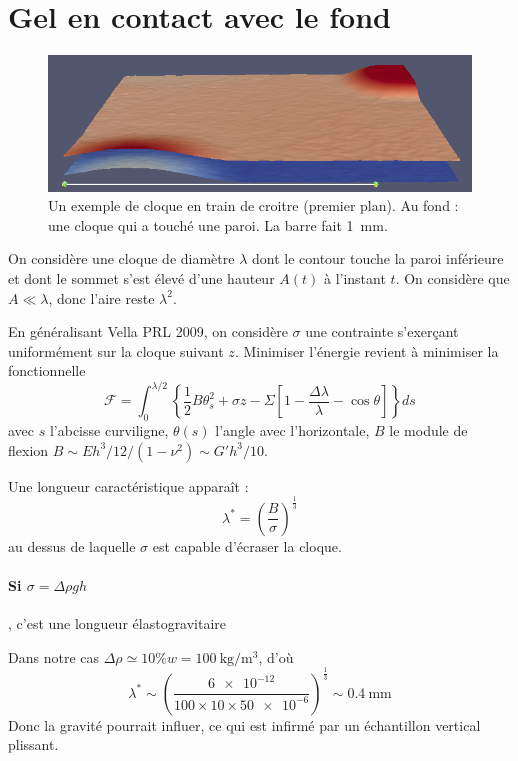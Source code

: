 \documentclass[12pt,a4paper]{article}
\author{Mathieu Leocmach}
\begin{document}
\section{Gel en contact avec le fond}

\begin{figure}
\includegraphics[width=\textwidth]{plots_0117.png}
\caption{Un exemple de cloque en train de croitre (premier plan). Au fond : une cloque qui a touché une paroi. La barre fait \SI{1}{\milli\metre}.}
\end{figure}

On considère une cloque de diamètre $\lambda$ dont le contour touche la paroi inférieure et dont le sommet s'est élevé d'une hauteur $A(t)$ à l'instant $t$. On considère que $A \ll \lambda$, donc l'aire reste $\lambda^2$.

En généralisant Vella PRL 2009, on considère $\sigma$ une contrainte s'exerçant uniformément sur la cloque suivant $z$. Minimiser l'énergie revient à minimiser la fonctionnelle
\begin{equation}
\mathcal{F} = \int_0^{\lambda/2}\left\lbrace\frac{1}{2} B \theta_s^2 + \sigma z - \Sigma \left[1-\frac{\Delta \lambda}{\lambda} - \cos\theta\right] \right\rbrace ds
\end{equation}
avec $s$ l'abcisse curviligne, $\theta(s)$ l'angle avec l'horizontale, $B$ le module de flexion $B \sim E h^3 /12 / (1-\nu^2) \sim G' h^3/10$.

Une longueur caractéristique apparaît :
\begin{equation}
\lambda^* = \left(\frac{B}{\sigma}\right)^\frac{1}{3}
\label{eq:lstar}
\end{equation}
au dessus de laquelle $\sigma$ est capable d'écraser la cloque.

\paragraph*{Si $\sigma = \Delta\rho g h$}, c'est une longueur élastogravitaire

Dans notre cas $\Delta\rho\simeq 10\%w = \SI{100}{\kilo\gram\per\metre^3}$, d'où
\begin{equation}
\lambda^* \sim \left(\frac{\num{6e-12}}{100\times 10 \times \num{50e-6}}\right)^\frac{1}{3} \sim \SI{0.4}{\milli\metre}
\end{equation}
Donc la gravité pourrait influer, ce qui est infirmé par un échantillon vertical plissant.
\end{document}
